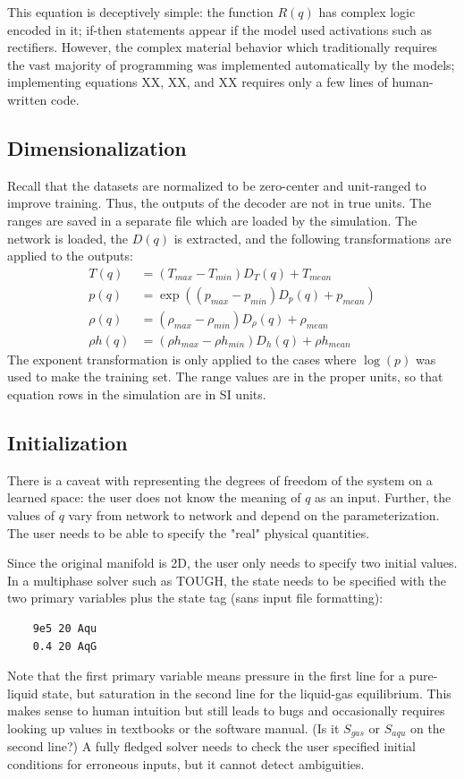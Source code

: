 \documentclass[]{article}
\begin{document}
This equation is deceptively simple: the function $R(q)$ has complex logic encoded in it; if-then
statements appear if the model used activations such as rectifiers.
However, the complex material behavior which traditionally requires
the vast majority of programming was implemented automatically by the
models; implementing equations XX, XX, and XX requires only a few lines
of human-written code. 

\subsection{Dimensionalization}

Recall that the datasets are normalized to be zero-center and
unit-ranged to improve training. Thus, the outputs of the decoder are not in true
units.
The ranges are saved in a separate file which are loaded by the
simulation. The network is loaded, the $D(q)$ is extracted, and the following
transformations are applied to the outputs:
\begin{align}
T(q)      &= \left(T_{max}-T_{min}\right) D_T(q) +T_{mean} \\
p(q)      &= \exp\left(\left( p_{max}-p_{min}\right)
            D_p(q) +p_{mean} \right) \\
\rho(q) &= \left(\rho_{max}-\rho_{min}\right) D_{\rho}(q) +\rho_{mean}\\
\rho h(q)      &= \left(\rho h_{max}-\rho h_{min}\right) D_h(q)  + \rho h_{mean}
\end{align}
The exponent transformation is only applied to the cases where
$\log(p)$ was used to make the training set.
The range values are in the proper units, so that equation rows in the
simulation are in SI units.


\hypertarget{header-n3339}{%
\subsection{Initialization}\label{header-n3339}}

There is a caveat with representing the degrees of freedom of the system
on a learned space: the user does not know the meaning of $q$ as an
input. Further, the values of $q$ vary from network to network and
depend on the parameterization. The user needs to be able to specify the
"real" physical quantities.

Since the original manifold is 2D, the user only needs to specify two
initial values. In a multiphase solver such as TOUGH, the state needs
to be specified with the two primary variables plus the state tag (sans input file formatting): 
\begin{verbatim}
    9e5 20 Aqu
    0.4 20 AqG
\end{verbatim}
Note that the first primary variable means pressure in the first line
for a pure-liquid state,
but saturation in the second line for the liquid-gas equilibrium.
This makes sense to human intuition but
still leads to bugs and occasionally requires looking up values in
textbooks or the software manual. (Is it $S_{gas}$ or $S_{aqu}$ on the second
line?) A fully fledged solver needs to check the user specified
initial conditions for erroneous inputs, but it cannot detect ambiguities.
\end{document}
